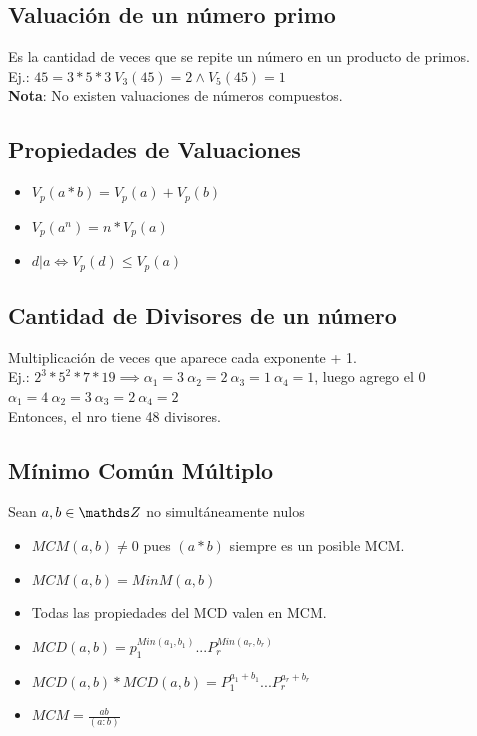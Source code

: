 \documentclass[10pt,a4paper]{article}
\begin{document}
\subsection*{Valuación de un número primo}
Es la cantidad de veces que se repite un número en un producto de primos. \\
Ej.: $45 = 3 * 5 * 3 \ V_{3}(45) = 2 \land V_{5}(45) = 1$ \\
\textbf{Nota}: No existen valuaciones de números compuestos.
\subsection*{Propiedades de Valuaciones}
\begin{itemize}
    \item $V_{p}(a * b) = V_{p}(a) + V_{p}(b)$
    \item $V_{p}(a^{n}) = n * V_{p}(a)$
    \item $d | a \iff V_{p}(d) \le V_{p}(a)$
\end{itemize}
\subsection*{Cantidad de Divisores de un número}
Multiplicación de veces que aparece cada exponente + 1. \\
Ej.: $2^{3} * 5^{2} * 7 * 19 \implies \alpha_{1} = 3 \ \alpha_{2} = 2 \ \alpha_{3} = 1 \ \alpha_{4} = 1$, luego agrego el 0 $\alpha_{1} = 4 \ \alpha_{2} = 3 \ \alpha_{3} = 2 \ \alpha_{4} = 2$ \\
Entonces, el nro tiene 48 divisores. \\
\subsection*{Mínimo Común Múltiplo}
Sean $a, b \in \ent$ no simultáneamente nulos 
\begin{itemize}
    \item $MCM(a, b) \neq 0$ pues $(a * b)$ siempre es un posible MCM. 
    \item $MCM(a, b) = Min M(a, b)$
    \item Todas las propiedades del MCD valen en MCM. 
    \item $MCD(a, b) = p_{1}^{Min(a_{1}, b_{1})} ... P_{r}^{Min(a_{r}, b_{r})}$
    \item $MCD(a, b) * MCD(a, b) = P_{1}^{a_{1} + b_{1}} ... P_{r}^{a_{r}+b_{r}}$
    \item $MCM = \frac{ab}{(a:b)}$
\end{itemize}
\end{document}
